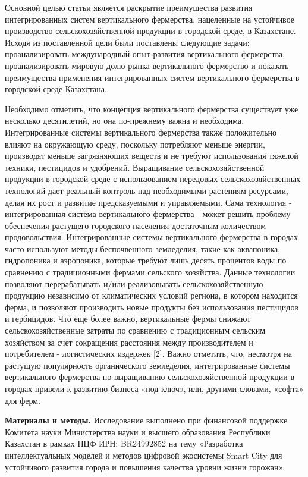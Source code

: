 Основной целью статьи является раскрытие преимущества развития
интегрированных систем вертикального фермерства, нацеленные на
устойчивое производство сельскохозяйственной продукции в городской
среде, в Казахстане. Исходя из поставленной цели были поставлены
следующие задачи: проанализировать международный опыт развития
вертикального фермерства, проанализировать мировую долю рынка
вертикального фермерство и показать преимущества применения
интегрированных систем вертикального фермерства в городской среде
Казахстана.

Необходимо отметить, что концепция вертикального фермерства существует
уже несколько десятилетий, но она по-прежнему важна и необходима.
Интегрированные системы вертикального фермерства также положительно
влияют на окружающую среду, поскольку потребляют меньше энергии,
производят меньше загрязняющих веществ и не требуют использования
тяжелой техники, пестицидов и удобрений. Выращивание
сельскохозяйственной продукции в городской среде с использованием
передовых сельскохозяйственных технологий дает реальный контроль над
необходимыми растениям ресурсами, делая их рост и развитие
предсказуемыми и управляемыми. Сама технология - интегрированная система
вертикального фермерства - может решить проблему обеспечения растущего
городского населения достаточным количеством продовольствия.
Интегрированные системы вертикального фермерства в городах часто
используют методы беспочвенного земледелия, такие как аквапоника,
гидропоника и аэропоника, которые требуют лишь десять процентов воды по
сравнению с традиционными фермами сельского хозяйства. Данные технологии
позволяют перерабатывать и/или реализовывать сельскохозяйственную
продукцию независимо от климатических условий региона, в котором
находится ферма, и позволяют производить новые продукты без
использования пестицидов и гербицидов. Что еще более важно, вертикальные
фермы снижают сельскохозяйственные затраты по сравнению с традиционным
сельским хозяйством за счет сокращения расстояния между производителем и
потребителем - логистических издержек {[}2{]}. Важно отметить, что,
несмотря на растущую популярность органического земледелия,
интегрированные системы вертикального фермерства по выращиванию
сельскохозяйственной продукции в городах привели к развитию бизнеса «под
ключ», или, другими словами, «софта» для ферм.

{\bfseries Материалы и методы.} Исследование выполнено при финансовой
поддержке Комитета науки Министерства науки и высшего образования
Республики Казахстан в рамках ПЦФ ИРН: BR24992852 на тему «Разработка
интеллектуальных моделей и методов цифровой экосистемы Smart City для
устойчивого развития города и повышения качества уровни жизни горожан».

